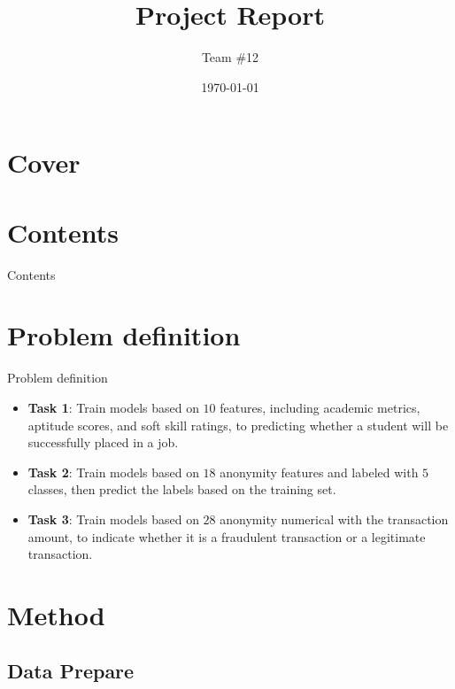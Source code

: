 \documentclass{beamer}
\title{Project Report}
\author{Team \#12}
\institute{
  \parbox{0.2\textwidth}{
    \centering WANG Zeyu
    \vspace{.25cm}
  }
  \parbox{0.2\textwidth}{
    \centering YANG Xirui
    \vspace{.25cm}
  }
  \parbox{0.2\textwidth}{
    \centering Wu Tianxiao
    \vspace{.25cm}
  }
}
\date{\today}
\begin{document}
\section*{Cover}
\frame{\titlepage}

\section*{Contents}
\begin{frame}{Contents}
  \tableofcontents
\end{frame}

\section{Problem definition}

\begin{frame}{Problem definition}

  \begin{itemize}
    \item \textbf{Task 1}: Train models based on $10$ features, including academic metrics, aptitude scores, and soft skill ratings, to predicting whether a student will be successfully placed in a job. \vspace{.25cm}
    \item \textbf{Task 2}: Train models based on $18$ anonymity features and labeled with $5$ classes, then predict the labels based on the training set. \vspace{.25cm}
    \item \textbf{Task 3}: Train models based on $28$ anonymity numerical with the transaction amount, to indicate whether it is a fraudulent transaction or a legitimate transaction. \vspace{.25cm}
  \end{itemize}

\end{frame}

\section{Method}

\subsection{Data Prepare}
\end{document}
